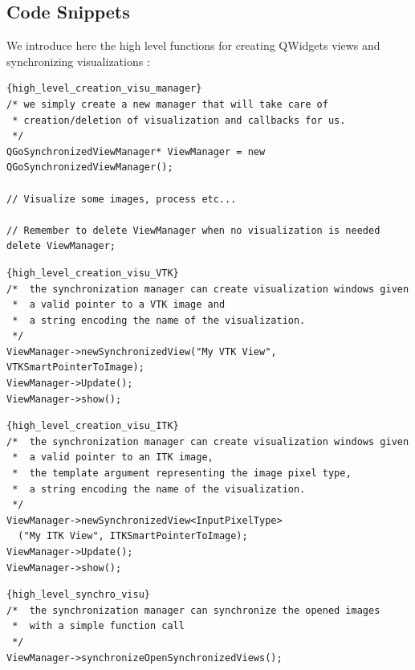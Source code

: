 \documentclass{InsightArticle}
\begin{document}
\subsection*{Code Snippets}
We introduce here the high level functions for creating QWidgets views and synchronizing visualizations :
\large
  \begin{lstlisting}[title={\large Creation of the visualization manager object}]{high_level_creation_visu_manager}
/* we simply create a new manager that will take care of 
 * creation/deletion of visualization and callbacks for us.
 */
QGoSynchronizedViewManager* ViewManager = new QGoSynchronizedViewManager();

// Visualize some images, process etc...

// Remember to delete ViewManager when no visualization is needed
delete ViewManager;
  \end{lstlisting}
\normalsize
\large
  \begin{lstlisting}[title={\large Visualization of a VTK image}]{high_level_creation_visu_VTK}
/*  the synchronization manager can create visualization windows given
 *  a valid pointer to a VTK image and 
 *  a string encoding the name of the visualization.
 */
ViewManager->newSynchronizedView("My VTK View", VTKSmartPointerToImage);
ViewManager->Update();
ViewManager->show();
  \end{lstlisting}
\normalsize
\large
  \begin{lstlisting}[title={\large Visualization of an ITK image}]{high_level_creation_visu_ITK}
/*  the synchronization manager can create visualization windows given
 *  a valid pointer to an ITK image,
 *  the template argument representing the image pixel type,
 *  a string encoding the name of the visualization.
 */
ViewManager->newSynchronizedView<InputPixelType>
  ("My ITK View", ITKSmartPointerToImage);
ViewManager->Update();
ViewManager->show();
  \end{lstlisting}
\normalsize
\large
  \begin{lstlisting}[title={\large Synchronization of the camera for several images}]{high_level_synchro_visu}
/*  the synchronization manager can synchronize the opened images 
 *  with a simple function call
 */
ViewManager->synchronizeOpenSynchronizedViews();
  \end{lstlisting}
\normalsize
\end{document}
